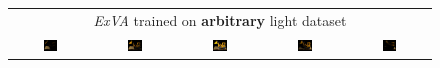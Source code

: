\begingroup
\begin{figure}[!htb]
    \centering
    \setlength\tabcolsep{2pt}
    \begin{tabular*}{\textwidth}{ c c c c c }
        \multicolumn{5}{c}{\textit{ExVA} trained on \textbf{arbitrary} light dataset} \\
          \includegraphics[width=0.19\textwidth]{figures/results/arb_set/dynamic_light/exva_rand_vc0_ld-90.png}
        & \includegraphics[width=0.19\textwidth]{figures/results/arb_set/dynamic_light/exva_rand_vc0_ld-60.png}
        & \includegraphics[width=0.19\textwidth]{figures/results/arb_set/dynamic_light/exva_rand_vc0_ld0.png}
        & \includegraphics[width=0.19\textwidth]{figures/results/arb_set/dynamic_light/exva_rand_vc0_ld60.png} 
        & \includegraphics[width=0.19\textwidth]{figures/results/arb_set/dynamic_light/exva_rand_vc0_ld90.png} \\
        

\end{tabular*}
\end{figure}
